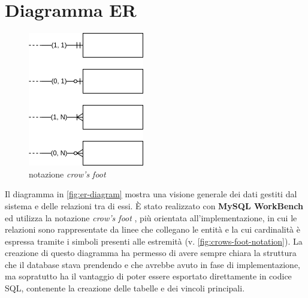 \section{Diagramma ER}

\begin{figure}
	\includegraphics[width=\linewidth]{assets/diagrams/crows-foot-notation.png}
	\cprotect\caption{notazione \textit{crow's foot}}
	\label{fig:crows-foot-notation}
\end{figure}

Il diagramma in \autoref{fig:er-diagram} mostra una visione generale dei dati
gestiti dal sistema e delle relazioni tra di essi. È stato realizzato con \textbf{MySQL WorkBench}
\cite{workbench:9-EER} ed utilizza la notazione \textit{crow's foot} \cite{wiki:crows-foot},
più orientata all'implementazione, in cui le relazioni sono rappresentate da linee
che collegano le entità e la cui cardinalità è espressa tramite i simboli presenti
alle estremità (v. \autoref{fig:crows-foot-notation}). La creazione di questo
diagramma ha permesso di avere sempre chiara la struttura che il database stava
prendendo e che avrebbe avuto in fase di implementazione, ma sopratutto ha il
vantaggio di poter essere esportato direttamente in codice SQL, contenente la
creazione delle tabelle e dei vincoli principali.


